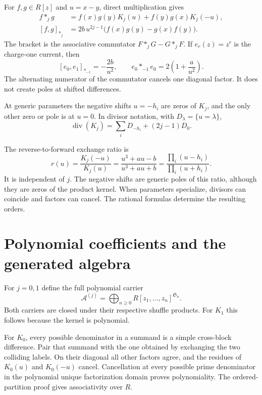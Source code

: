 For $f,g\in R[z]$ and $u=x-y$, direct multiplication gives
\begin{align*}
 f*_jg&=f(x)g(y)K_j(u)+f(y)g(x)K_j(-u),\\
 [f,g]_{*_j}
 &=2b\,u^{2j-1}\bigl(f(x)g(y)-g(x)f(y)\bigr).
\end{align*}
The bracket is the associative commutator $F*_jG-G*_jF$.
If $e_r(z)=z^r$ is the charge-one current, then
\begin{equation}\label{cbc:l027:binary-currents}
 [e_0,e_1]_{*_{-1}}=-\frac{2b}{u^2},
 \qquad e_0*_{-1}e_0=2\left(1+\frac a{u^2}\right).
\end{equation}
The alternating numerator of the commutator cancels one diagonal
factor.  It does not create poles at shifted differences.

At generic parameters the negative shifts $u=-h_i$ are zeros of
$K_j$, and the only other zero or pole is at $u=0$.
In divisor notation, with $D_\lambda=\{u=\lambda\}$,
\[
 \operatorname{div}(K_j)=\sum_iD_{-h_i}+(2j-1)D_0.
\]

The reverse-to-forward exchange ratio is
\begin{equation}\label{cbc:l027:ratio}
 r(u)=\frac{K_j(-u)}{K_j(u)}
 =\frac{u^3+au-b}{u^3+au+b}
 =\frac{\prod_i(u-h_i)}{\prod_i(u+h_i)}.
\end{equation}
It is independent of $j$.  The negative shifts are generic poles
of this ratio, although they are zeros of the product kernel.
When parameters specialize, divisors can coincide and factors can
cancel.  The rational formulas determine the resulting orders.

\section{Polynomial coefficients and the generated algebra}
For $j=0,1$ define the full polynomial carrier
\[
 \mathcal A^{(j)}=
 \bigoplus_{n\geq0}R[z_1,\ldots,z_n]^{\mathfrak S_n}.
\]
Both carriers are closed under their respective shuffle products.
For $K_1$ this follows because the kernel is polynomial.

For $K_0$, every possible denominator in a summand is a simple
cross-block difference.  Pair that summand with the one obtained by
exchanging the two colliding labels.  On their diagonal all other
factors agree, and the residues of $K_0(u)$ and $K_0(-u)$ cancel.
Cancellation at every possible prime denominator in the polynomial
unique factorization domain proves polynomiality.  The
ordered-partition proof gives associativity over $R$.

